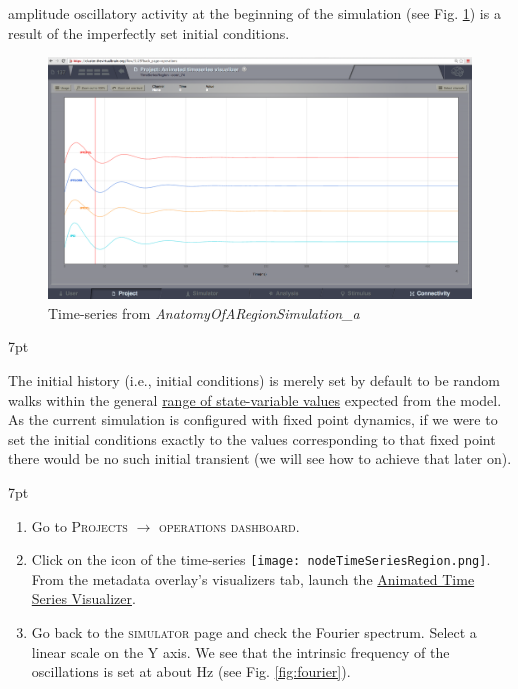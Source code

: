 \documentclass{tufte-handout}
\newenvironment{formal}{%
  \def\FrameCommand{%
    \hspace{1pt}%
    {\color{DarkBlue}\vrule width 2pt}%
    {\color{formalshade}\vrule width 4pt}%
    \colorbox{formalshade}%
  }%
  \MakeFramed{\advance\hsize-\width\FrameRestore}%
  \noindent\hspace{-4.55pt}%
  \begin{adjustwidth}{}{7pt}%
  \vspace{2pt}\vspace{2pt}%
}
{%
  \vspace{2pt}\end{adjustwidth}\endMakeFramed%
}
\newenvironment{blah}{%
  \def\FrameCommand{%
    \hspace{1pt}%
    {\color{DarkOrange}\vrule width 2pt}%
    {\color{PeachPuff}\vrule width 4pt}%
    \colorbox{PeachPuff}%
  }%
  \MakeFramed{\advance\hsize-\width\FrameRestore}%
  \noindent\hspace{-4.55pt}%
  \begin{adjustwidth}{}{7pt}%
  \vspace{2pt}\vspace{2pt}%
}
{%
  \vspace{2pt}\end{adjustwidth}\endMakeFramed%
}
\begin{document}
 amplitude oscillatory activity at the beginning of the
simulation (see Fig. \ref{fig:time_series}) is a result of the imperfectly set initial conditions.

\begin{figure}[h]
  \includegraphics[width=\linewidth]{Handout_UI_BuildingYourOwnBrainNetworkModel_AnimatedTimeSeries}%
  \caption{Time-series from \textit{AnatomyOfARegionSimulation\_a}}%
  \label{fig:time_series}%
\end{figure}
 
\begin{blah}
The initial history (i.e., initial conditions) is
merely set by default to be random walks within the general \underline{range of state-variable values} expected from the model. 
As the current simulation is
configured with fixed point dynamics, if we were to set the initial conditions
exactly to the values corresponding to that fixed point there would be no such
initial transient (we will see how to achieve that later on).
\end{blah}


\begin{formal}
\begin{enumerate}
\item Go to \textsc{Projects} $\rightarrow$ \textsc{operations dashboard}.
\item Click on the icon of the time-series \texttt{[image: nodeTimeSeriesRegion.png]}. From the metadata overlay's visualizers tab, launch the \underline{Animated Time Series Visualizer}.
\item Go back to the \textsc{simulator} page and check the Fourier spectrum. Select a linear scale on the Y axis. We see that the intrinsic frequency of the oscillations is set at about \unit[11]{Hz} (see Fig. \ref{fig:fourier}). 
\end{enumerate}
\end{formal}
\end{document}
